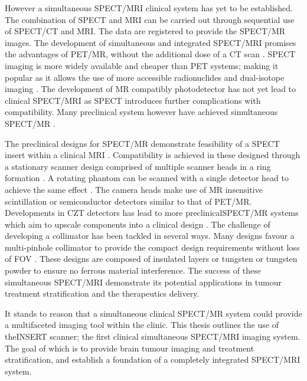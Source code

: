However a simultaneous \acrshort{SPECT/MRI} clinical system has yet to be established. The combination of \acrshort{SPECT} and \acrshort{MRI} can be carried out through sequential use of \acrshort{SPECT/CT} and \acrshort{MRI}. The data are registered to provide the \acrshort{SPECT/MR} images. The development of simultaneous and integrated \acrshort{SPECT/MRI} promises the advantages of \acrshort{PET/MR}, without the additional dose of a \acrshort{CT} scan \cite{en2019ImageStudy}. \acrshort{SPECT} imaging is more widely available and cheaper than \acrshort{PET} systems; making it popular as it allows the use of more accessible radionuclides and dual-isotope imaging \cite{deRosales2014PotentialAgents} \cite{Bateman2012AdvantagesPractice}. The development of \acrshort{MR} compatibly photodetector has not yet lead to clinical \acrshort{SPECT/MRI} as \acrshort{SPECT} introduces further complications with compatibility. Many preclinical system however have achieved simultaneous \acrshort{SPECT/MR} \cite{Meng2007DesignImaging}.

The preclinical designs for \acrshort{SPECT/MR} demonstrate feasibility of a \acrshort{SPECT} insert within a clinical \acrshort{MRI} \cite{Cai2014MRC-SPECT:Animals}. Compatibility is achieved in these designed through a stationary scanner design comprised of multiple scanner heads in a ring formation . A rotating phantom can be scanned with a single detector head to achieve the same effect \cite{Hamamura2010DevelopmentAcquisition.}. The camera heads make use of \acrshort{MR} insensitive scintillation or semiconductor detectors similar to that of \acrshort{PET/MR}. Developments in \acrshort{CZT} detectors has lead to more preclinical\acrshort{SPECT/MR} systems which aim to upscale components into a clinical design \cite{0031-9155-55-6-002} \cite{Tan2011ExperimentalField} \cite{Cai2013HybridSystem}. The challenge of developing a collimator has been tackled in several ways. Many designs favour a multi-pinhole collimator to provide the compact design requirements without loss of \acrshort{FOV} \cite{Meier2011AAnimals}. These designs are composed of insulated layers or tungsten or tungsten powder to ensure no ferrous material interference. The success of these simultaneous \acrshort{SPECT/MRI} demonstrate its potential applications in tumour treatment stratification and the therapeutics delivery. 

It stands to reason that a simultaneous clinical \acrshort{SPECT/MR} system could provide a multifaceted imaging tool within the clinic. This thesis outlines the use of the\acrshort{INSERT} scanner; the first clinical simultaneous \acrshort{SPECT/MRI} imaging system. The goal of which is to provide brain tumour imaging and treatment stratification, and establish a foundation of a completely integrated \acrshort{SPECT/MRI} system. 

